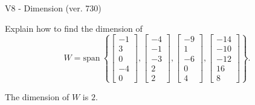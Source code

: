 \begin{exercise}
  \begin{exerciseTitle}V8 - Dimension (ver. 730)\end{exerciseTitle}
  \begin{exerciseStatement}
    Explain how to find the dimension of 
\[W=\mathrm{span}\ \left\{\left[\begin{array}{r}
-1 \\
3 \\
0 \\
-4 \\
0
\end{array}\right] , \left[\begin{array}{r}
-4 \\
-1 \\
-3 \\
2 \\
2
\end{array}\right] , \left[\begin{array}{r}
-9 \\
1 \\
-6 \\
0 \\
4
\end{array}\right] , \left[\begin{array}{r}
-14 \\
-10 \\
-12 \\
16 \\
8
\end{array}\right]\right\}.\]



  \end{exerciseStatement}
  \begin{exerciseAnswer}
   The dimension of \(W\) is  \(2\).
  


  \end{exerciseAnswer}
\end{exercise}